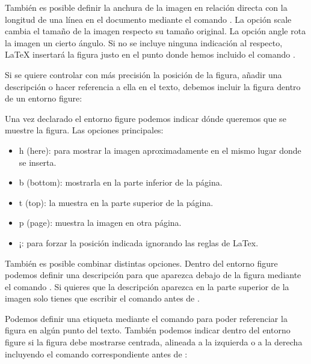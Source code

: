 \documentclass[11pt, a4paper]{article}
\begin{document}
También es posible definir la anchura de la imagen en relación directa con la longitud de una línea en el documento mediante el comando . La opción scale cambia el tamaño de la imagen respecto su tamaño original. La opción angle rota la imagen un cierto ángulo. Si no se incluye ninguna indicación al respecto, LaTeX insertará la figura justo en el punto donde hemos incluido el comando .

Si se quiere controlar con más precisión la posición de la figura, añadir una descripción o hacer referencia a ella en el texto, debemos incluir la figura dentro de un entorno figure:




Una vez declarado el entorno figure podemos indicar dónde queremos que se muestre la figura. Las opciones principales:
\begin{itemize}
\item h (here): para mostrar la imagen aproximadamente en el mismo lugar donde se inserta.

\item b (bottom): mostrarla en la parte inferior de la página.

\item t (top): la muestra en la parte superior de la página.

\item p (page): muestra la imagen en otra página.

\item ¡: para forzar la posición indicada ignorando las reglas de LaTex.
\end{itemize}

También es posible combinar distintas opciones. Dentro del entorno figure podemos definir una descripción para que aparezca debajo de la figura mediante el comando . Si quieres que la descripción aparezca en la parte superior de la imagen solo tienes que escribir el comando  antes de .

Podemos definir una etiqueta mediante el comando  para poder referenciar la figura en algún punto del texto. También podemos indicar dentro del entorno figure si la figura debe mostrarse centrada, alineada a la izquierda o a la derecha incluyendo el comando correspondiente antes de :
\end{document}
